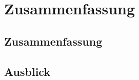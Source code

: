 \chapter{Zusammenfassung}
\label{chap:zusammenfassung}
\section{Zusammenfassung}
\label{sec:zusammenfassung}
\section{Ausblick}
\label{sec:ausblick}